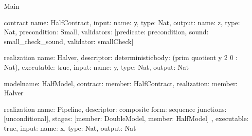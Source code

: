 \begin{lexlean}{Main}
\begin{semanticmodule}
contract{
  name: HalfContract,
  input: {name: y, type: Nat},
  output: {name: z, type: Nat},
  precondition: Small,
  validators: [{predicate: precondition, sound: small_check_sound, validator: smallCheck}]
}

realization{
  name: Halver,
  descriptor: deterministic{body: (prim quotient y 2 0 : Nat)},
  executable: true,
  input: {name: y, type: Nat},
  output: Nat
}

model{name: HalfModel, contract: {member: HalfContract}, realization: {member: Halver}}

realization{
  name: Pipeline,
  descriptor: composite{
    form: sequence{
      junctions: [unconditional{}],
      stages: [{member: DoubleModel}, {member: HalfModel}]
    }
  },
  executable: true,
  input: {name: x, type: Nat},
  output: Nat
}
\end{semanticmodule}
\end{lexlean}

